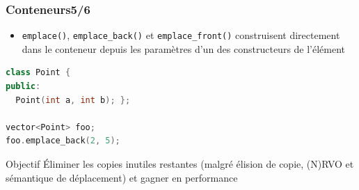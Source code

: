 \documentclass[C++.tex]{subfiles}
\begin{document}
\begin{frame}[fragile]
	\frametitle{Conteneurs\titlehfill{}5/6}
	\begin{itemize}
		\item \lstinline|emplace()|, \lstinline|emplace_back()| et \lstinline|emplace_front()| construisent directement dans le conteneur depuis les paramètres d'un des constructeurs de l'élément
	\end{itemize}

	\begin{lstlisting}[language=C++]
class Point {
public:
  Point(int a, int b); };

vector<Point> foo;
foo.emplace_back(2, 5);\end{lstlisting}

	\begin{block}{Objectif}
		Éliminer les copies inutiles restantes (malgré élision de copie, (N)RVO et sémantique de déplacement) et gagner en performance

	\end{block}
\end{frame}
\end{document}
